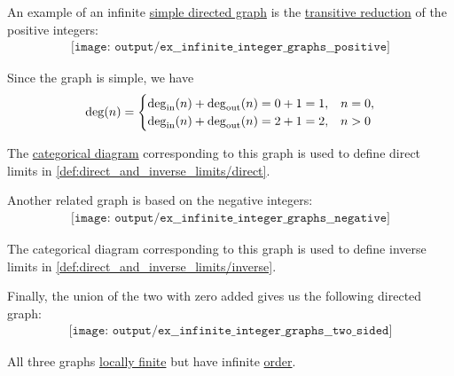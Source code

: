 \begin{example}\label{ex:infinite_integer_graphs}
  An example of an infinite \hyperref[def:directed_graph]{simple directed graph} is the \hyperref[def:transitive_reduction]{transitive reduction} of the positive integers:
  \begin{equation}\label{eq:ex:infinite_integer_graphs/positive}
    \begin{aligned}
      \texttt{[image: output/ex\_\_infinite\_integer\_graphs\_\_positive]}
    \end{aligned}
  \end{equation}

  Since the graph is simple, we have
  \begin{equation*}
    \deg(n) = \begin{cases}
      \deg_{\op{in}}(n) + \deg_{\op{out}}(n) = 0 + 1 = 1, &n = 0, \\
      \deg_{\op{in}}(n) + \deg_{\op{out}}(n) = 2 + 1 = 2, &n > 0 \\
    \end{cases}
  \end{equation*}

  The \hyperref[def:categorical_diagram]{categorical diagram} corresponding to this graph is used to define direct limits in \cref{def:direct_and_inverse_limits/direct}.

  Another related graph is based on the negative integers:
  \begin{equation}\label{eq:ex:infinite_integer_graphs/negative}
    \begin{aligned}
      \texttt{[image: output/ex\_\_infinite\_integer\_graphs\_\_negative]}
    \end{aligned}
  \end{equation}

  The categorical diagram corresponding to this graph is used to define inverse limits in \cref{def:direct_and_inverse_limits/inverse}.

  Finally, the union of the two with zero added gives us the following directed graph:
  \begin{equation}\label{eq:ex:infinite_integer_graphs/two_sided}
    \begin{aligned}
      \texttt{[image: output/ex\_\_infinite\_integer\_graphs\_\_two\_sided]}
    \end{aligned}
  \end{equation}

  All three graphs \hyperref[def:graph_cardinality/local]{locally finite} but have infinite \hyperref[def:graph_cardinality/order]{order}.
\end{example}
